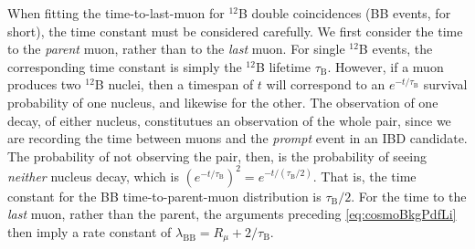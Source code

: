 \documentclass[../thesis.tex]{subfiles}
\begin{document}
When fitting the time-to-last-muon for $^{12}$B double coincidences (BB events, for short), the time constant must be considered carefully. We first consider the time to the \emph{parent} muon, rather than to the \emph{last} muon. For single $^{12}$B events, the corresponding time constant is simply the $^{12}$B lifetime $\tau_{\mathrm{B}}$.  However, if a muon produces two $^{12}$B nuclei, then a timespan of $t$ will correspond to an $e^{-t/\tau_{\mathrm{B}}}$ survival probability of one nucleus, and likewise for the other. The observation of one decay, of either nucleus, constitutues an observation of the whole pair, since we are recording the time between muons and the \emph{prompt} event in an IBD candidate. The probability of not observing the pair, then, is the probability of seeing \emph{neither} nucleus decay, which is $(e^{-t/\tau_{\mathrm{B}}})^2 = e^{-t/(\tau_{\mathrm{B}}/2)}$. That is, the time constant for the BB time-to-parent-muon distribution is $\tau_{\mathrm{B}}/2$. For the time to the \emph{last} muon, rather than the parent, the arguments preceding \autoref{eq:cosmoBkgPdfLi} then imply a rate constant of $\lambda_{\mathrm{BB}} = R_\mu + 2/\tau_{\mathrm{B}}$.
\begin{comment}
\footnote{We neglect the possibility of only seeing \emph{one} of the nuclei decay, since the IBD coincidence cut of \us{200} is far shorter than the $^{12}$B lifetime of 29~ms, and therefore, the observation of one decay effectively \emph{implies} the observation of the other.}

 As such, the time constant for BB events is $\tau_{\mathrm{B}}/2$. (I'm not sure I buy this. We are \emph{assuming} that the two decays occur within 200~us of each other, and the probability of seeing them both is basically equivalent to the probability of seeing the first, and the time-to-last-muon PDF for the first just has the time constant of $\tau$. Where the time constant \emph{does} get halved is if we consider a muon that produces two nuclei and we want the probability of seeing none i.e. the time to the next decay.)
\end{comment}

\begin{comment}
  XXX our code has the 12B half-life (20 ms) listed as the lifetime (should be 29 ms). This further exacerbates the use of the mistaken(???) factor of 2??? In total our time constant has been off by a factor of 3 (well, plus the Rmu part)
\end{comment}
\end{document}
